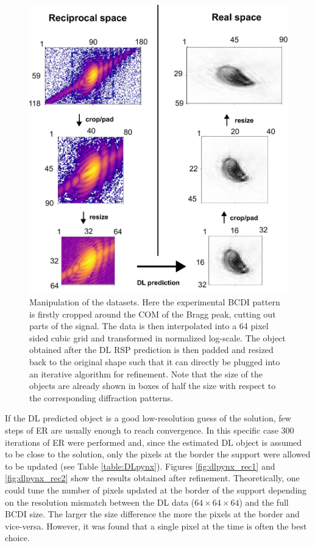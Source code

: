 \begin{figure}[H]
    \centering
    \includegraphics[width=\textwidth]{figures/Phasing/resizing.pdf}
    \caption{Manipulation of the datasets. Here the experimental BCDI pattern is firstly cropped around the COM of the Bragg peak, 
    cutting out parts of the signal. The data is then interpolated into a 64 pixel sided cubic grid and transformed in normalized 
    log-scale. The object obtained after the DL RSP prediction is then padded and resized back to the original shape such that it 
    can directly be plugged into an iterative algorithm for refinement. Note that the size of the objects are already 
    shown in boxes of half the size with respect to the corresponding diffraction patterns.}
    \label{fig:resizing}
\end{figure}

If the DL predicted object is a good low-resolution guess of the solution, few steps of ER are usually enough to reach 
convergence. In this specific case 300 iterations of ER were performed and, since the estimated DL object is assumed 
to be close to the solution, only the pixels at the border the support were allowed 
to be updated (see Table \ref{table:DLpynx}). Figures \ref{fig:dlpynx_rec1} and \ref{fig:dlpynx_rec2} show the results 
obtained after refinement. Theoretically, one could tune the number of pixels updated at the border of the support depending 
on the resolution mismatch between the DL data ($64\times64\times64$) and the full BCDI size. The larger the size difference 
the more the pixels at the border and vice-versa. However, it was found that a single pixel at the time is often the 
best choice. 

